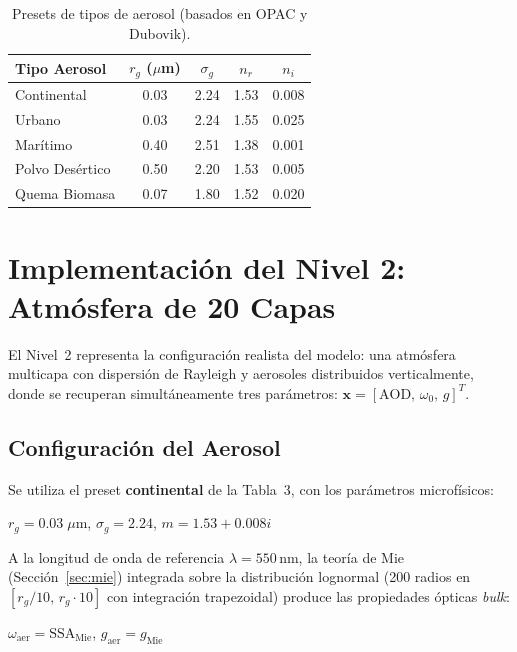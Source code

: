 \documentclass[a4paper,11pt]{article}
\begin{document}
\begin{table}[H]
\centering
\small
\begin{tabular}{@{}lcccc@{}}
\toprule
\textbf{Tipo Aerosol} & $r_g$ ($\mu$m) & $\sigma_g$ & $n_r$ & $n_i$ \\ \midrule
Continental     & 0.03 & 2.24 & 1.53 & 0.008 \\
Urbano          & 0.03 & 2.24 & 1.55 & 0.025 \\
Mar\'itimo       & 0.40 & 2.51 & 1.38 & 0.001 \\
Polvo Des\'ertico & 0.50 & 2.20 & 1.53 & 0.005 \\
Quema Biomasa   & 0.07 & 1.80 & 1.52 & 0.020 \\
\bottomrule
\end{tabular}
\caption{Presets de tipos de aerosol (basados en OPAC y Dubovik).}
\end{table}


\section{Implementaci\'on del Nivel 2: Atm\'osfera de 20 Capas}\label{sec:level2_impl}

El Nivel~2 representa la configuraci\'on realista del modelo: una atm\'osfera
multicapa con dispersi\'on de Rayleigh y aerosoles distribuidos verticalmente,
donde se recuperan simult\'aneamente tres par\'ametros:
$\mathbf{x} = [\text{AOD},\,\omega_0,\,g]^T$.

\subsection{Configuraci\'on del Aerosol}

Se utiliza el preset \textbf{continental} de la Tabla~3, con los par\'ametros
microf\'isicos:
\begin{center}
    $r_g = 0.03\;\mu$m, \quad $\sigma_g = 2.24$, \quad
    $m = 1.53 + 0.008i$
\end{center}

A la longitud de onda de referencia $\lambda = 550$\,nm, la teor\'ia de Mie
(Secci\'on~\ref{sec:mie}) integrada sobre la distribuci\'on lognormal
(200 radios en $[r_g/10,\, r_g \cdot 10]$ con integraci\'on trapezoidal)
produce las propiedades \'opticas \emph{bulk}:
\begin{center}
    $\omega_{\text{aer}} = \text{SSA}_{\text{Mie}}$, \qquad
    $g_{\text{aer}} = g_{\text{Mie}}$
\end{center}
\end{document}
